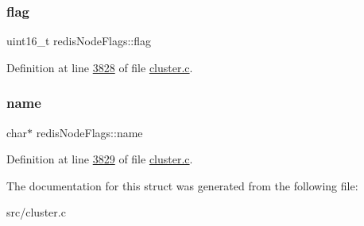 \subsubsection{\texorpdfstring{flag}{flag}}
{\footnotesize\ttfamily uint16\+\_\+t redis\+Node\+Flags\+::flag}



Definition at line \hyperlink{cluster_8c_source_l03828}{3828} of file \hyperlink{cluster_8c_source}{cluster.\+c}.

\mbox{\label{structredisNodeFlags_a470e406fdd288c7432fdbe9843867ba8}} 
\subsubsection{\texorpdfstring{name}{name}}
{\footnotesize\ttfamily char$\ast$ redis\+Node\+Flags\+::name}



Definition at line \hyperlink{cluster_8c_source_l03829}{3829} of file \hyperlink{cluster_8c_source}{cluster.\+c}.



The documentation for this struct was generated from the following file\+:\begin{DoxyCompactItemize}
\item 
src/cluster.\+c\end{DoxyCompactItemize}
